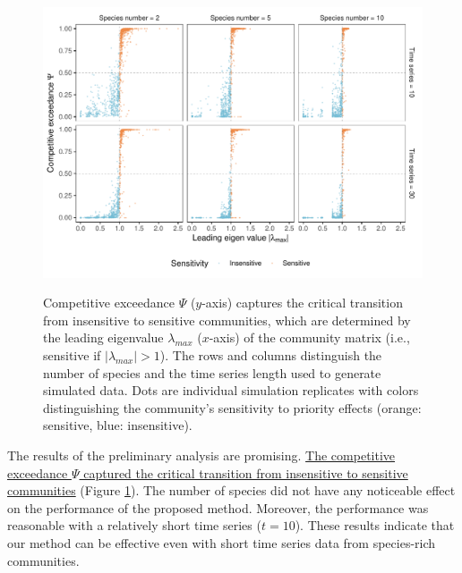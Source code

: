 \documentclass[12pt, class=article, crop=false]{standalone}
\begin{document}
\begin{figure}
    \caption{Competitive exceedance $\Psi$ ($y$-axis) captures the critical transition from insensitive to sensitive communities, which are determined by the leading eigenvalue $\lambda_{max}$ ($x$-axis) of the community matrix (i.e., sensitive if $|\lambda_{max}| > 1$).
    The rows and columns distinguish the number of species and the time series length used to generate simulated data.
    Dots are individual simulation replicates with colors distinguishing the community's sensitivity to priority effects (orange: sensitive, blue: insensitive).}
    \includegraphics[scale=0.65]{output/figure_eigen_scatter.pdf}
    \label{fig:box}
\end{figure}

The results of the preliminary analysis are promising.
\ul{The competitive exceedance $\Psi$ captured the critical transition from insensitive to sensitive communities} (Figure \ref{fig:box}).
The number of species did not have any noticeable effect on the performance of the proposed method.
Moreover, the performance was reasonable with a relatively short time series ($t = 10$).
These results indicate that our method can be effective even with short time series data from species-rich communities. 
\end{document}
